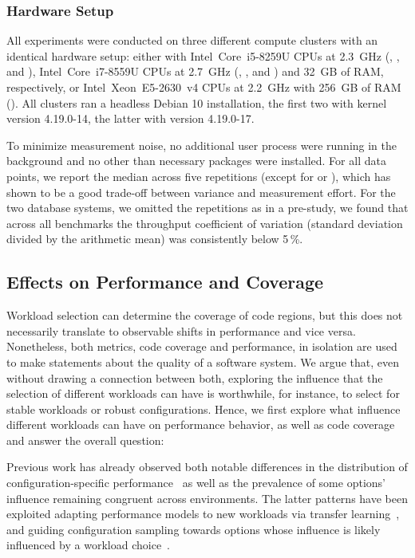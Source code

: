{	\subsubsection{Hardware Setup}
	All experiments were conducted on three different compute clusters with an identical hardware setup: either with Intel~Core~i5-8259U CPUs at 2.3~GHz (\jumper, \kanzi, and \hsqldb),  Intel~Core~i7-8559U CPUs at 2.7~GHz (\dconvert, \batik, and \jadx) and 32~GB of RAM, respectively, or Intel~Xeon~E5-2630~v4 CPUs at 2.2~GHz with 256~GB of RAM (\htwo). All clusters ran a headless Debian 10 installation, the first two with kernel version \mbox{4.19.0-14}, the latter with version \mbox{4.19.0-17}. 
	
	To minimize measurement noise, no additional user process were running in the background and no other than necessary packages were installed.
	For all data points, we report the median across five repetitions (except for \hsqldb or \htwo), which has shown to be a good trade-off between variance and measurement effort. For the two database systems, we omitted the repetitions as in a pre-study, we found that across all benchmarks the throughput coefficient of variation (standard deviation divided by the arithmetic mean) was consistently below 5\,\%.
}

\subsection{Effects on Performance and Coverage}
Workload selection can determine the coverage of code regions, but this does not necessarily translate to observable shifts in performance and vice versa. Nonetheless, both metrics, code coverage and performance, in isolation are used to make statements about the quality of a software system. We argue that, even without drawing a connection between both, exploring the influence that the selection of different workloads can have is worthwhile, for instance, to select for stable workloads or robust configurations. Hence, we first explore what influence different workloads can have on performance behavior, as well as code coverage and answer the overall question:


Previous work has already observed both notable differences in the distribution of configuration-specific performance~\cite{alves_sampling_2020} as well as the prevalence of some options’ influence remaining congruent across environments. The latter patterns have been exploited adapting performance models to new workloads via transfer learning~\cite{jamishidi_transfer_2017,jamshidi_transfer_gp_2017}, and guiding configuration sampling towards options whose influence is likely influenced by a workload choice~\cite{jamshidi_learning_2018}. 

